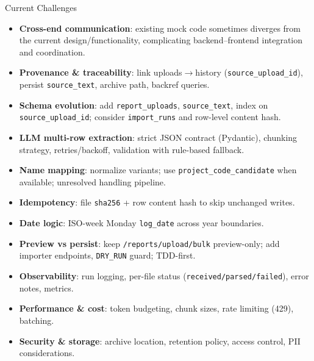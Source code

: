 \documentclass [aspectratio=169]{beamer}
\begin{document}
\begin{frame}{Current Challenges}
\begin{itemize}
    \item \textbf{Cross-end communication}: existing mock code sometimes diverges from the current design/functionality, complicating backend–frontend integration and coordination.
    \item \textbf{Provenance \& traceability}: link uploads$\to$history (\texttt{source\_upload\_id}), persist \texttt{source\_text}, archive path, backref queries.
    \item \textbf{Schema evolution}: add \texttt{report\_uploads}, \texttt{source\_text}, index on \texttt{source\_upload\_id}; consider \texttt{import\_runs} and row-level content hash.
    \item \textbf{LLM multi-row extraction}: strict JSON contract (Pydantic), chunking strategy, retries/backoff, validation with rule-based fallback.
    \item \textbf{Name mapping}: normalize variants; use \texttt{project\_code\_candidate} when available; unresolved handling pipeline.
    \item \textbf{Idempotency}: file \texttt{sha256} + row content hash to skip unchanged writes.
    \item \textbf{Date logic}: ISO-week Monday \texttt{log\_date} across year boundaries.
    \item \textbf{Preview vs persist}: keep \texttt{/reports/upload/bulk} preview-only; add importer endpoints, \texttt{DRY\_RUN} guard; TDD-first.
    \item \textbf{Observability}: run logging, per-file status (\texttt{received/parsed/failed}), error notes, metrics.
    \item \textbf{Performance \& cost}: token budgeting, chunk sizes, rate limiting (429), batching.
    \item \textbf{Security \& storage}: archive location, retention policy, access control, PII considerations.
\end{itemize}
\end{frame}
\end{document}
